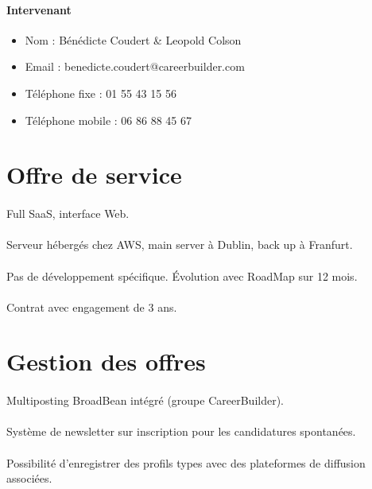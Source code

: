 \paragraph{Intervenant}
\begin{itemize}
	\item Nom : Bénédicte Coudert \& Leopold Colson
	\item Email : benedicte.coudert@careerbuilder.com
	\item Téléphone fixe : 01 55 43 15 56
	\item Téléphone mobile : 06 86 88 45 67  
\end{itemize}


\section{Offre de service}
\paragraph{} Full SaaS, interface Web.
\paragraph{} Serveur hébergés chez AWS, main server à Dublin, back up à Franfurt.
\paragraph{} Pas de développement spécifique. Évolution avec RoadMap sur 12 mois.
\paragraph{} Contrat avec engagement de 3 ans.

\section{Gestion des offres}
\paragraph{} Multiposting BroadBean intégré (groupe CareerBuilder). 
\paragraph{} Système de newsletter sur inscription pour les candidatures spontanées.
\paragraph{} Possibilité d'enregistrer des profils types avec des plateformes de diffusion associées. 
